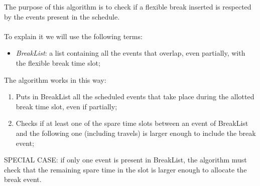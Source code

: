 The purpose of this algorithm is to check if a flexible break inserted is respected by the events present in the schedule. \\ \\
To explain it we will use the following terms: 
\begin{itemize}
	\item \textit{BreakList}: a list containing all the events that overlap, even partially, with the flexible break time slot;
\end{itemize}
The algorithm works in this way:
\begin{enumerate}
	\item Puts in BreakList all the scheduled events that take place during the allotted break time slot, even if partially;
	\item Checks if at least one of the spare time slots between an event of BreakList and the following one (including travels) is larger enough to include the break event;
\end{enumerate}	
SPECIAL CASE: if only one event is present in BreakList, the algorithm must check that the remaining spare time in the slot is larger enough to allocate the break event.